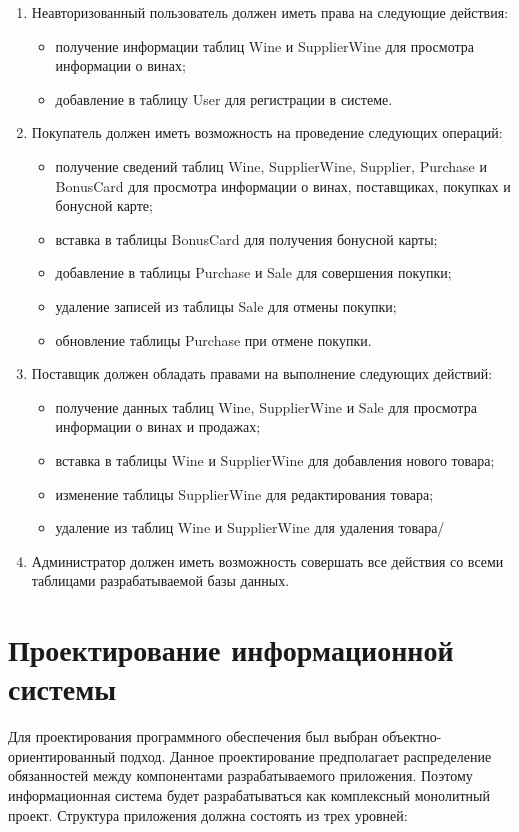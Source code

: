 \begin{enumerate}
	\item Неавторизованный пользователь должен иметь права на следующие действия:
		\begin{itemize}
			\item получение информации таблиц Wine и SupplierWine для просмотра информации о винах;
			\item добавление в таблицу User для регистрации в системе.
		\end{itemize}
	\item Покупатель должен иметь возможность на проведение следующих операций:
		\begin{itemize}
			\item получение сведений таблиц Wine, SupplierWine, Supplier, Purchase и BonusCard для просмотра информации о винах, поставщиках, покупках и бонусной карте;
			\item вставка в таблицы BonusCard для получения бонусной карты;
			\item добавление в таблицы Purchase и Sale для совершения покупки;
			\item удаление записей из таблицы Sale для отмены покупки;
			\item обновление таблицы Purchase при отмене покупки.
		\end{itemize}
	\item Поставщик должен обладать правами на выполнение следующих действий:
		\begin{itemize}
			\item получение данных таблиц Wine, SupplierWine и Sale для просмотра информации о винах и продажах;
			\item вставка в таблицы Wine и SupplierWine для добавления нового товара;
			\item изменение таблицы SupplierWine для редактирования товара;
			\item удаление из таблиц Wine и SupplierWine для удаления товара/
		\end{itemize}
	\item Администратор должен иметь возможность совершать все действия со всеми таблицами разрабатываемой базы данных.
\end{enumerate} 

\section{Проектирование информационной системы}

Для проектирования программного обеспечения был выбран объектно-ориентированный подход. Данное проектирование предполагает распределение обязанностей между компонентами разрабатываемого приложения. Поэтому информационная система будет разрабатываться как комплексный монолитный проект. Структура приложения должна состоять из трех уровней:

